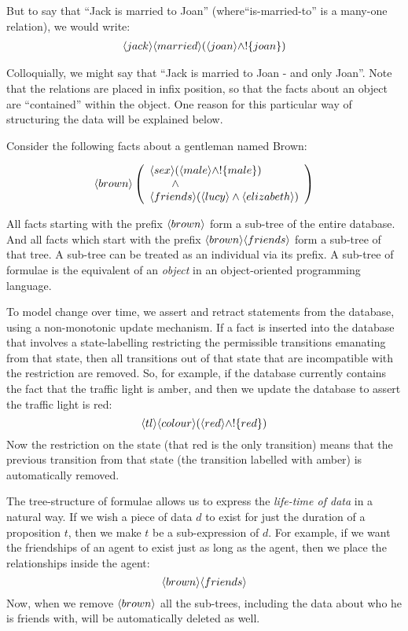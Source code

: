\NI But to say that ``Jack is married to Joan''
(where``is-married-to'' is a many-one relation), we would write:
\begin{eqnarray*}
  \langle jack \rangle \langle married \rangle (\langle joan \rangle \land ! \{joan\})
\end{eqnarray*}

\NI Colloquially, we might say that ``Jack is married to Joan - and
only Joan''.  Note that the relations are placed in infix position, so
that the facts about an object are ``contained'' within the object.
One reason for this particular way of structuring the data will be
explained below.
 
Consider the following facts about a gentleman named Brown:

\[
   \langle brown \rangle \left(
   \begin{array}{l}
     \langle sex \rangle (\langle male \rangle \land ! \{male\}) \\
        \qquad \land \\
     \langle friends \rangle (\langle lucy \rangle \land \langle elizabeth \rangle ) 
   \end{array}
   \right)
\]

\NI All facts  starting with the prefix $\MAY{brown}$ form a
sub-tree of the entire database.  And all  facts which start with
the prefix $\MAY{brown} \MAY{friends}$ form a sub-tree of that tree.
A sub-tree can be treated as an individual via its prefix.  
A sub-tree of formulae is the \cathoristic{} equivalent of an
\emph{object} in an object-oriented programming language.

To model change over time, we assert and retract statements from the
database, using a non-monotonic update mechanism.  If a fact is
inserted into the database that involves a state-labelling restricting
the permissible  transitions emanating from that state, then all
transitions out of that state that are incompatible with the
restriction are removed.  So, for example, if the database currently
contains the fact that the traffic light is amber, and then we update
the database to assert the traffic light is red:
\[
\langle tl \rangle \langle colour \rangle (\langle red \rangle \land !\{red\})
\]
Now the restriction on the state (that red is the only transition)
means that the previous transition from that state (the transition
labelled with amber) is automatically removed.

The tree-structure of formulae allows us to express the \emph{life-time of data} in a natural way. 
If we wish a piece of data $d$ to exist for just the duration of a proposition $t$, then we make $t$ be a sub-expression of $d$. 
For example, if we want the friendships of an agent to exist just as long as the agent, then we place the relationships inside the agent: 
\[
\langle brown \rangle \langle friends \rangle \]
Now, when we remove $\MAY{brown}$ all the sub-trees, including the data about who he is friends with, will be automatically deleted as well.

